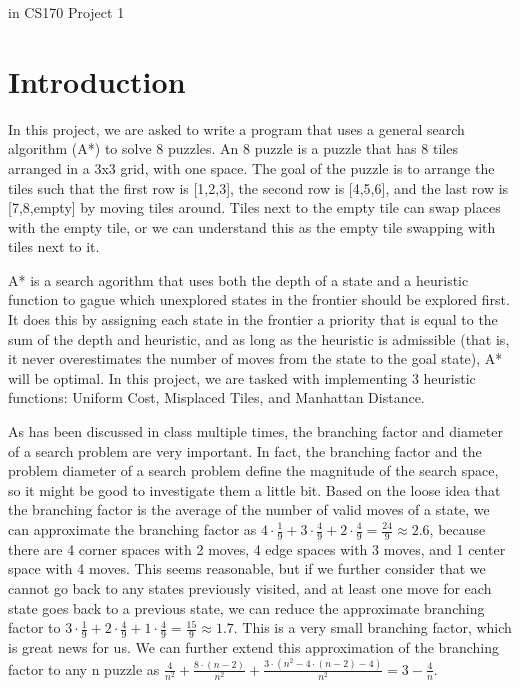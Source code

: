 \documentclass{article}
\date{}
\begin{document}
{\LARGE{ in CS170 Project 1}}
\vskip 0.5in
{}
{}
{}
{}
\vskip 0.5in
\tableofcontents
\listoffigures
\pagebreak
\section{Introduction}
In this project, we are asked to write a program that uses a general search algorithm (A*) to solve 8 puzzles. An 8 puzzle is a puzzle that has 8 tiles arranged in a 3x3 grid, with one space. The goal of the puzzle is to arrange the tiles such that the first row is [1,2,3], the second row is [4,5,6], and the last row is [7,8,empty] by moving tiles around. Tiles next to the empty tile can swap places with the empty tile, or we can understand this as the empty tile swapping with tiles next to it.
\par A* is a search agorithm that uses both the depth of a state and a heuristic function to gague which unexplored states in the frontier should be explored first. It does this by assigning each state in the frontier a priority that is equal to the sum of the depth and heuristic, and as long as the heuristic is admissible (that is, it never overestimates the number of moves from the state to the goal state), A* will be optimal. In this project, we are tasked with implementing 3 heuristic functions: Uniform Cost, Misplaced Tiles, and Manhattan Distance.
\par As has been discussed in class multiple times, the branching factor and diameter of a search problem are very important. In fact, the branching factor and the problem diameter of a search problem define the magnitude of the search space, so it might be good to investigate them a little bit. Based on the loose idea that the branching factor is the average of the number of valid moves of a state, we can approximate the branching factor as $4\cdot\frac{1}{9}+3\cdot\frac{4}{9}+2\cdot\frac{4}{9} = \frac{24}{9} \approx 2.6$, because there are 4 corner spaces with 2 moves, 4 edge spaces with 3 moves, and 1 center space with 4 moves. This seems reasonable, but if we further consider that we cannot go back to any states previously visited, and at least one move for each state goes back to a previous state, we can reduce the approximate branching factor to $3\cdot\frac{1}{9}+2\cdot\frac{4}{9}+1\cdot\frac{4}{9} = \frac{15}{9} \approx 1.7$. This is a very small branching factor, which is great news for us. We can further extend this approximation of the branching factor to any n puzzle as $\frac{4}{n^2}+\frac{8\cdot(n-2)}{n^2}+\frac{3\cdot(n^2-4\cdot(n-2)-4)}{n^2} = 3-\frac{4}{n}$.
\par
\end{document}
